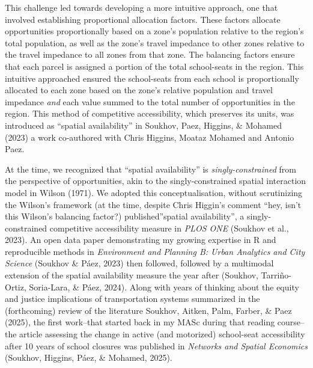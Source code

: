 \documentclass[
11pt, %
oneside, %
english, %
singlespacing, %
]{macthesis} %
\begin{document}
This challenge led towards developing a more intuitive approach, one that involved establishing proportional allocation factors. These factors allocate opportunities proportionally based on a zone's population relative to the region's total population, as well as the zone's travel impedance to other zones relative to the travel impedance to all zones from that zone. The balancing factors ensure that each parcel is assigned a portion of the total school-seats in the region. This intuitive approached ensured the school-seats from each school is proportionally allocated to each zone based on the zone's relative population and travel impedance \emph{and} each value summed to the total number of opportunities in the region. This method of competitive accessibility, which preserves its units, was introduced as ``spatial availability'' in Soukhov, Paez, Higgins, \& Mohamed (2023) a work co-authored with Chris Higgins, Moataz Mohamed and Antonio Paez.

At the time, we recognized that ``spatial availability'' is \emph{singly-constrained} from the perspective of opportunities, akin to the singly-constrained spatial interaction model in Wilson (1971). We adopted this conceptualisation, without scrutinizing the Wilson's framework (at the time, despite Chris Higgin's comment ``hey, isn't this Wilson's balancing factor?) published''spatial availability'', a singly-constrained competitive accessibility measure in \emph{PLOS ONE} (Soukhov et al., 2023). An open data paper demonstrating my growing expertise in R and reproducible methods in \emph{Environment and Planning B: Urban Analytics and City Science} (Soukhov \& Páez, 2023) then followed, followed by a multimodal extension of the spatial availability measure the year after (Soukhov, Tarriño-Ortiz, Soria-Lara, \& Páez, 2024). Along with years of thinking about the equity and justice implications of transportation systems summarized in the (forthcoming) review of the literature Soukhov, Aitken, Palm, Farber, \& Paez (2025), the first work--that started back in my MASc during that reading course--the article assessing the change in active (and motorized) school-seat accessibility after 10 years of school closures was published in \emph{Networks and Spatial Economics} (Soukhov, Higgins, Páez, \& Mohamed, 2025).
\end{document}
